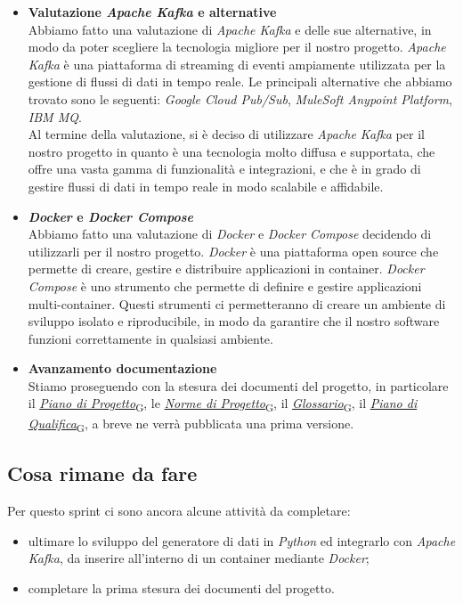 \documentclass[italian,12pt]{article}
\begin{document}
\begin{itemize}
	\item \textbf{Valutazione \textit{Apache Kafka} e alternative} \\
	Abbiamo fatto una valutazione di \textit{Apache Kafka} e delle sue alternative, in modo da poter scegliere la tecnologia migliore per il nostro progetto. \textit{Apache Kafka} è una piattaforma di streaming di eventi ampiamente utilizzata per la gestione di flussi di dati in tempo reale. Le principali alternative che abbiamo trovato sono le seguenti: \textit{Google Cloud Pub/Sub}, \textit{MuleSoft Anypoint Platform}, \textit{IBM MQ}. \\
	Al termine della valutazione, si è deciso di utilizzare \textit{Apache Kafka} per il nostro progetto in quanto è una tecnologia molto diffusa e supportata, che offre una vasta gamma di funzionalità e integrazioni, e che è in grado di gestire flussi di dati in tempo reale in modo scalabile e affidabile.
	\item \textbf{\textit{Docker} e \textit{Docker Compose}} \\
	Abbiamo fatto una valutazione di \textit{Docker} e \textit{Docker Compose} decidendo di utilizzarli per il nostro progetto. \textit{Docker} è una piattaforma open source che permette di creare, gestire e distribuire applicazioni in container. \textit{Docker Compose} è uno strumento che permette di definire e gestire applicazioni multi-container. Questi strumenti ci permetteranno di creare un ambiente di sviluppo isolato e riproducibile, in modo da garantire che il nostro software funzioni correttamente in qualsiasi ambiente.
	\item \textbf{Avanzamento documentazione} \\
	Stiamo proseguendo con la stesura dei documenti del progetto, in particolare il \href{https://7last.github.io/docs/rtb/documentazione-interna/glossario\#piano-di-progetto}{\textit{Piano di Progetto}\textsubscript{G}}, le \href{https://7last.github.io/docs/rtb/documentazione-interna/glossario\#norme-di-progetto}{\textit{Norme di Progetto}\textsubscript{G}}, il \href{https://7last.github.io/docs/rtb/documentazione-interna/glossario\#glossario}{\textit{Glossario}\textsubscript{G}}, il \href{https://7last.github.io/docs/rtb/documentazione-interna/glossario\#piano-di-qualifica}{\textit{Piano di Qualifica}\textsubscript{G}}, a breve ne verrà pubblicata una prima versione.
\end{itemize}

\subsection{Cosa rimane da fare}
Per questo sprint ci sono ancora alcune attività da completare:
\begin{itemize}
	\item ultimare lo sviluppo del generatore di dati in \textit{Python} ed integrarlo con \textit{Apache Kafka}, da inserire all'interno di un container mediante \textit{Docker};
	\item completare la prima stesura dei documenti del progetto.
\end{itemize}
\end{document}
